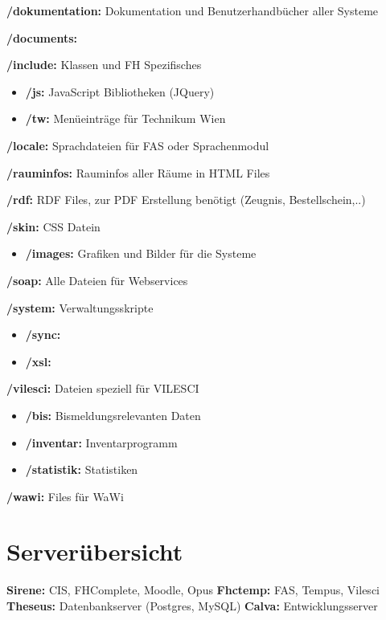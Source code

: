 {\bf/dokumentation:} Dokumentation und Benutzerhandb\"ucher aller Systeme

{\bf/documents:}

{\bf/include:} Klassen und FH Spezifisches
\begin{itemize}
	\item{{\bf/js:} JavaScript Bibliotheken (JQuery)}
	\item{{\bf/tw:} Men\"ueintr\"age f\"ur Technikum Wien}
\end{itemize}
{\bf/locale:} Sprachdateien f\"ur FAS oder Sprachenmodul

{\bf/rauminfos:} Rauminfos aller R\"aume in HTML Files

{\bf/rdf:} RDF Files, zur PDF Erstellung ben\"otigt (Zeugnis, Bestellschein,..) 

{\bf/skin:} CSS Datein 
\begin{itemize}
	\item{{\bf/images:} Grafiken und Bilder f\"ur die Systeme}
\end{itemize}

{\bf/soap:} Alle Dateien f\"ur Webservices

{\bf/system:} Verwaltungsskripte 
\begin{itemize}
	\item{{\bf/sync:}}
	\item{{\bf/xsl:}}
\end{itemize}

{\bf/vilesci:} Dateien speziell f\"ur VILESCI
\begin{itemize}
	\item{{\bf/bis:} Bismeldungsrelevanten Daten}
	\item{{\bf/inventar:} Inventarprogramm}
	\item{{\bf/statistik:} Statistiken}
\end{itemize}

{\bf/wawi:} Files f\"ur WaWi

\section{Server\"ubersicht}

{\bf Sirene:} CIS, FHComplete, Moodle, Opus \newline
{\bf Fhctemp:} FAS, Tempus, Vilesci \newline
{\bf Theseus:} Datenbankserver (Postgres, MySQL) \newline
{\bf Calva:} Entwicklungsserver \newline